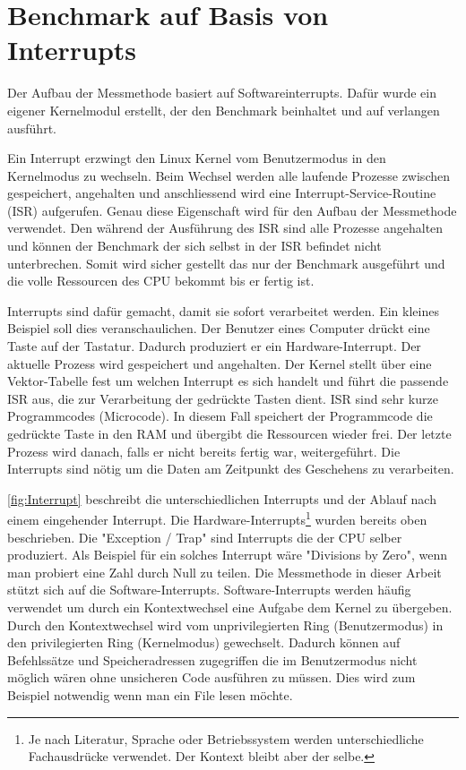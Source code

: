 
\section{Benchmark auf Basis von Interrupts}
\label{chap:benchmark_basis_interrupts}

Der Aufbau der Messmethode basiert auf Softwareinterrupts. Dafür wurde ein eigener Kernelmodul erstellt, der den Benchmark beinhaltet und auf verlangen ausführt.
\par
Ein Interrupt erzwingt den Linux Kernel vom Benutzermodus in den Kernelmodus zu wechseln\cite{Mandl2010_3}. Beim Wechsel werden alle laufende Prozesse zwischen gespeichert, angehalten und anschliessend wird eine Interrupt-Service-Routine (ISR) aufgerufen. Genau diese Eigenschaft wird für den Aufbau der Messmethode verwendet. Den während der Ausführung des ISR sind alle Prozesse angehalten und können der Benchmark der sich selbst in der ISR befindet nicht unterbrechen. Somit wird sicher gestellt das nur der Benchmark ausgeführt und die volle Ressourcen des CPU bekommt bis er fertig ist.
\par
Interrupts sind dafür gemacht, damit sie sofort verarbeitet werden. Ein kleines Beispiel soll dies veranschaulichen. Der Benutzer eines Computer drückt eine Taste auf der Tastatur. Dadurch produziert er ein Hardware-Interrupt. Der aktuelle Prozess wird gespeichert und angehalten. Der Kernel stellt über eine Vektor-Tabelle fest um welchen Interrupt es sich handelt und führt die passende ISR aus, die zur Verarbeitung der gedrückte Tasten dient. ISR sind sehr kurze Programmcodes (Microcode). In diesem Fall speichert der Programmcode die gedrückte Taste in den RAM und übergibt die Ressourcen wieder frei. Der letzte Prozess wird danach, falls er nicht bereits fertig war, weitergeführt. Die Interrupts sind nötig um die Daten am Zeitpunkt des Geschehens zu verarbeiten.
\par
\autoref{fig:Interrupt} beschreibt die unterschiedlichen Interrupts und der Ablauf nach einem eingehender Interrupt. Die Hardware-Interrupts\footnote{Je nach Literatur, Sprache oder Betriebssystem werden unterschiedliche Fachausdrücke verwendet. Der Kontext bleibt aber der selbe.} wurden bereits oben beschrieben. Die "Exception / Trap" sind Interrupts die der CPU selber produziert. Als Beispiel für ein solches Interrupt wäre "Divisions by Zero", wenn man probiert eine Zahl durch Null zu teilen. Die Messmethode in dieser Arbeit stützt sich auf die Software-Interrupts. Software-Interrupts werden häufig verwendet um durch ein Kontextwechsel eine Aufgabe dem Kernel zu übergeben. Durch den Kontextwechsel wird vom unprivilegierten Ring  (Benutzermodus) in den privilegierten Ring (Kernelmodus) gewechselt. Dadurch können auf Befehlssätze und Speicheradressen zugegriffen die im Benutzermodus nicht möglich wären ohne unsicheren Code ausführen zu müssen. Dies wird zum Beispiel notwendig wenn man ein File lesen möchte.

